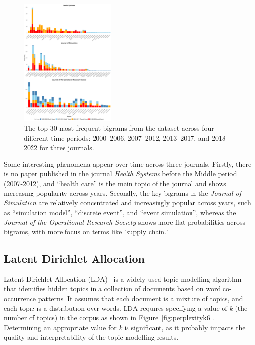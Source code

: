 \documentclass[9pt,twocolumn,twoside]{pnas-new}
\begin{document}
\begin{figure}[!tbhp]
\centering
\includegraphics[width=0.42\textwidth]{bag_words/hist_journals_fre.png}

\caption{The top 30 most frequent bigrams from the dataset across four different time periods: 2000–2006, 2007–2012, 2013–2017, and 2018–2022 for three journals.}
\label{fig:bagwordstime}
\end{figure}

Some interesting phenomena appear over time across three journals. Firstly, there is no paper published in the journal \textit{Health Systems} before the Middle period (2007-2012), and ``health care'' is the main topic of the journal and shows increasing popularity across years. Secondly, the key bigrams in the \textit{Journal of Simulation} are relatively concentrated and increasingly popular across years, such as ``simulation model'', ``discrete event'', and ``event simulation'', whereas the \textit{Journal of the Operational Research Society} shows more flat probabilities across bigrams, with more focus on terms like "supply chain."


\subsection*{Latent Dirichlet Allocation} Latent Dirichlet Allocation (LDA)~\cite{10.4108/eai.13-7-2018.159623} is a widely used topic modelling algorithm that identifies hidden topics in a collection of documents based on word co-occurrence patterns. It assumes that each document is a mixture of topics, and each topic is a distribution over words. LDA requires specifying a value of \textit{k} (the number of topics) in the corpus as shown in Figure~\ref{fig:perplexityk6}. Determining an appropriate value for \textit{k} is significant, as it probably impacts the quality and interpretability of the topic modelling results. 
\end{document}
